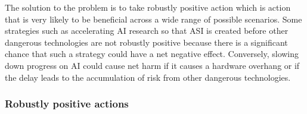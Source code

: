 \documentclass{article}
\begin{document}
The solution to the problem is to take robustly positive action \cite{superintelligence} which is action that is very likely to be beneficial across a wide range of possible scenarios. Some strategies such as accelerating AI research so that ASI is created before other dangerous technologies are not robustly positive because there is a significant chance that such a strategy could have a net negative effect. Conversely, slowing down progress on AI could cause net harm if it causes a hardware overhang or if the delay leads to the accumulation of risk from other dangerous technologies.

\subsubsection{Robustly positive actions}
\end{document}
